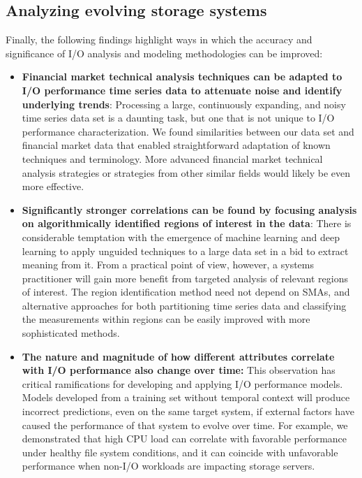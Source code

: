 \subsection{Analyzing evolving storage systems}

Finally, the following findings highlight ways in which the accuracy and significance of 
I/O analysis and modeling methodologies can be improved:

\begin{itemize}[leftmargin=*]

\item \textbf{Financial market technical analysis techniques can be adapted
to I/O performance time series data to attenuate noise and identify
underlying trends}: Processing a large, continuously expanding, and noisy
time series data set is a daunting task, but one that is not unique to I/O
performance characterization.  We found similarities
between our data set and financial market data that enabled straightforward
adaptation of known techniques and terminology.  More advanced financial
market technical analysis strategies or strategies from other similar fields would likely be even more effective.

\item \textbf{Significantly stronger correlations can be found by focusing
analysis on algorithmically identified regions of interest in the data}:
There is considerable temptation with the emergence of machine learning and
deep learning to apply unguided techniques to a large data set in a bid to
extract meaning from it. From a practical point of view, however, a systems
practitioner will gain more benefit from targeted analysis of relevant regions of
interest.  The region identification method need not depend on SMAs, and alternative
approaches for both partitioning time series data and classifying the
measurements within regions can be easily improved with more sophisticated methods.

\item \textbf{The nature and magnitude of how different attributes correlate
with I/O performance also change over time:}  This observation has critical
ramifications for developing and applying I/O performance models.  Models developed from a training set without temporal context
will produce incorrect predictions, even on the same target system, if
external factors have caused the performance of that system to evolve over
time. For example, we demonstrated that high CPU load can correlate with favorable performance under healthy file system conditions, and it can coincide with unfavorable performance when non-I/O workloads are impacting storage servers.

\end{itemize}
